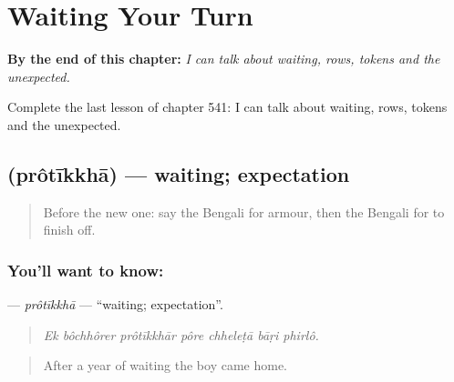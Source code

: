 
\chapter{Waiting Your Turn}
\label{ch:bn-waiting-your-turn}

\begin{chapteropening}
\textbf{By the end of this chapter:} \emph{I can talk about waiting, rows, tokens and the unexpected.}

Complete the last lesson of chapter 541: I can talk about waiting, rows, tokens and the unexpected.
\end{chapteropening}

\section[\texorpdfstring{\bn{প্রতীক্ষা} (prôtīkkhā)}{প্রতীক্ষা (prôtīkkhā)}]{ (prôtīkkhā) — waiting; expectation}

\label{lesson:BN-C541-protikkha}



\begin{quote}
Before the new one: say the Bengali for armour, then the Bengali for to finish off.
\end{quote}

\subsection*{You'll want to know: }
\textbf{} — \emph{prôtīkkhā} — \textquotedblleft{}waiting; expectation\textquotedblright{}.

\begin{quote}
      
\end{quote}

\begin{quote}
\emph{Ek bôchhôrer prôtīkkhār pôre chheleṭā bāṛi phirlô.}
\end{quote}

\begin{quote}
After a year of waiting the boy came home.
\end{quote}

